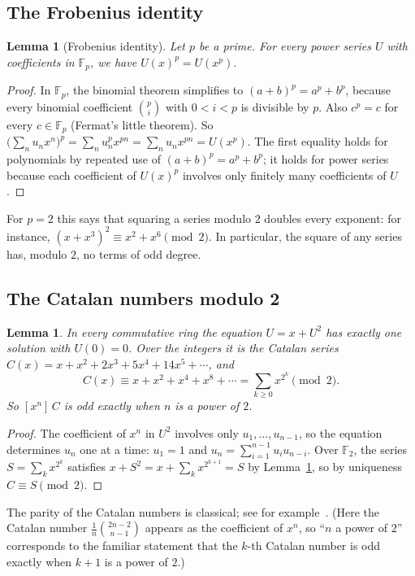 \documentclass[11pt,a4paper]{article}
\newtheorem{lemma}[theorem]{Lemma}
\theoremstyle{definition}
\theoremstyle{remark}
\newcommand{\F}{\mathbb{F}}
\newcommand{\coeff}[2]{[x^{#1}]\,#2}
\begin{document}
\subsection{The Frobenius identity}
\begin{lemma}[Frobenius identity]\label{lem:frobenius}
Let $p$ be a prime. For every power series $U$ with coefficients in $\F_p$, we have $U(x)^p=U(x^p)$.
\end{lemma}

\begin{proof}
In $\F_p$, the binomial theorem simplifies to $(a+b)^p=a^p+b^p$, because every binomial coefficient
$\binom pi$ with $0<i<p$ is divisible by $p$. Also $c^p=c$ for every $c\in\F_p$ (Fermat's little theorem). So
$\bigl(\sum_nu_nx^n\bigr)^p=\sum_nu_n^px^{pn}=\sum_nu_nx^{pn}=U(x^p)$. The first equality holds for polynomials by
repeated use of $(a+b)^p=a^p+b^p$; it holds for power series because each coefficient of $U(x)^p$ involves only finitely
many coefficients of $U$.
\end{proof}

For $p=2$ this says that squaring a series modulo $2$ doubles every exponent: for instance,
$(x+x^3)^2\equiv x^2+x^6\pmod2$. In particular, the square of any series has, modulo $2$, no terms of odd degree.

\subsection{The Catalan numbers modulo 2}
\begin{lemma}\label{lem:catalan}
In every commutative ring the equation $U=x+U^2$ has exactly one solution with $U(0)=0$. Over the integers it is the
Catalan series $C(x)=x+x^2+2x^3+5x^4+14x^5+\cdots$, and
\[
C(x)\equiv x+x^2+x^4+x^8+\cdots=\sum_{k\ge0}x^{2^k}\pmod 2 .
\]
So $\coeff{n}{C}$ is odd exactly when $n$ is a power of $2$.
\end{lemma}

\begin{proof}
The coefficient of $x^n$ in $U^2$ involves only $u_1,\dots,u_{n-1}$, so the equation determines $u_n$ one at a time:
$u_1=1$ and $u_n=\sum_{i=1}^{n-1}u_iu_{n-i}$. Over $\F_2$, the series $S=\sum_kx^{2^k}$ satisfies
$x+S^2=x+\sum_kx^{2^{k+1}}=S$ by Lemma~\ref{lem:frobenius}, so by uniqueness $C\equiv S\pmod2$.
\end{proof}
The parity of the Catalan numbers is classical; see for example~\cite{deutschsagan}. (Here the Catalan number
$\frac1{n}\binom{2n-2}{n-1}$ appears as the coefficient of $x^n$, so ``$n$ a power of $2$'' corresponds to the familiar
statement that the $k$-th Catalan number is odd exactly when $k+1$ is a power of $2$.)
\end{document}
